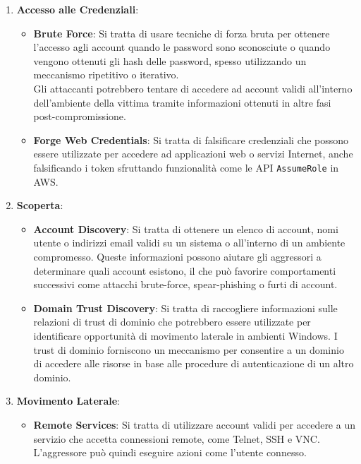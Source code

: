 \documentclass{article}
\begin{document}
\begin{enumerate}
\begin{itemize}
            \item \textbf{File and Directory Permissions Modification}: Si tratta di modificare i permessi/attributi di file o directory per eludere le liste di controllo degli accessi (gestiti da ACL) e accedere ai file protetti.
        \end{itemize}
    \newpage
    \item \textbf{Accesso alle Credenziali}:
        \begin{itemize}
            \item \textbf{Brute Force}: Si tratta di usare tecniche di forza bruta per ottenere l'accesso agli account quando le password sono sconosciute o quando vengono ottenuti gli hash delle password, spesso utilizzando un meccanismo ripetitivo o iterativo.\\
            Gli attaccanti potrebbero tentare di accedere ad account validi all'interno dell'ambiente della vittima tramite informazioni ottenuti in altre fasi post-compromissione.

            \item \textbf{Forge Web Credentials}: Si tratta di falsificare credenziali che possono essere utilizzate per accedere ad applicazioni web o servizi Internet, anche falsificando i token sfruttando funzionalità come le API \verb|AssumeRole| in AWS.
        \end{itemize}

    \item \textbf{Scoperta}:
        \begin{itemize}
            \item \textbf{Account Discovery}: Si tratta di ottenere un elenco di account, nomi utente o indirizzi email validi su un sistema o all'interno di un ambiente compromesso. Queste informazioni possono aiutare gli aggressori a determinare quali account esistono, il che può favorire comportamenti successivi come attacchi brute-force, spear-phishing o furti di account.

            \item \textbf{Domain Trust Discovery}: Si tratta di raccogliere informazioni sulle relazioni di trust di dominio che potrebbero essere utilizzate per identificare opportunità di movimento laterale in ambienti Windows. I trust di dominio forniscono un meccanismo per consentire a un dominio di accedere alle risorse in base alle procedure di autenticazione di un altro dominio.
        \end{itemize}

    \item \textbf{Movimento Laterale}:
        \begin{itemize}
            \item \textbf{Remote Services}: Si tratta di utilizzare account validi per accedere a un servizio che accetta connessioni remote, come Telnet, SSH e VNC. L'aggressore può quindi eseguire azioni come l'utente connesso.


\end{itemize}
\end{enumerate}
\end{document}
